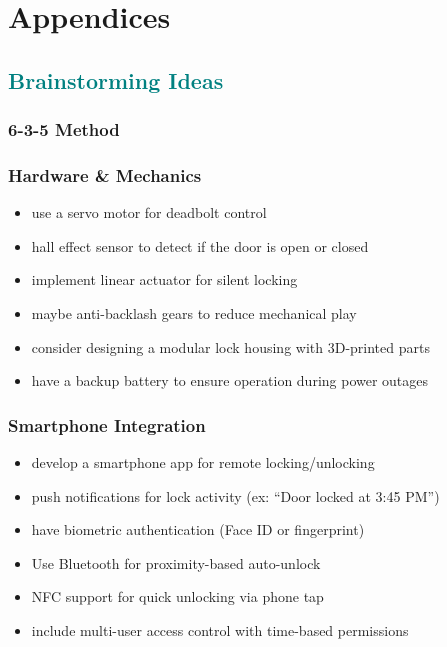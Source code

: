 \section{Appendices}

\textcolor{teal}{\subsection{Brainstorming Ideas}}

\subsubsection{6-3-5 Method} \label{635 method}
\subsubsection*{Hardware \& Mechanics}
\begin{itemize}
    \item use a servo motor for deadbolt control
    \item hall effect sensor to detect if the door is open or closed
    \item implement linear actuator for silent locking
    \item maybe anti-backlash gears to reduce mechanical play
    \item consider designing a modular lock housing with 3D-printed parts
    \item have a backup battery to ensure operation during power outages
\end{itemize}

\subsubsection*{Smartphone Integration}
\begin{itemize}
    \item develop a smartphone app for remote locking/unlocking
    \item push notifications for lock activity (ex: ``Door locked at 3:45 PM'')
    \item have biometric authentication (Face ID or fingerprint)
    \item Use Bluetooth for proximity-based auto-unlock
    \item NFC support for quick unlocking via phone tap
    \item include multi-user access control with time-based permissions
\end{itemize}

